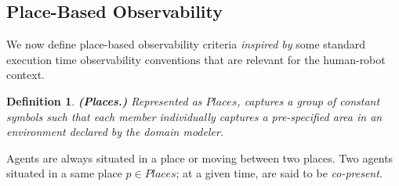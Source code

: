 \documentclass[letterpaper]{article} %
\newtheorem{definition}{Definition}
\begin{document}
\subsection{Place-Based Observability}
We now define place-based observability criteria \textit{inspired by} some standard execution time observability conventions that are relevant for the human-robot context. 

\begin{definition}
\textbf{(Places.)} Represented as $\mathit{Places}$, captures a group of constant symbols such that each member individually captures a pre-specified area in an environment declared by the domain modeler.  
\end{definition}
Agents are always situated in a place or moving between two places. Two agents situated in a same place $p \in \mathit{Places}$; at a given time, are said to be \textit{co-present}.


\end{document}

